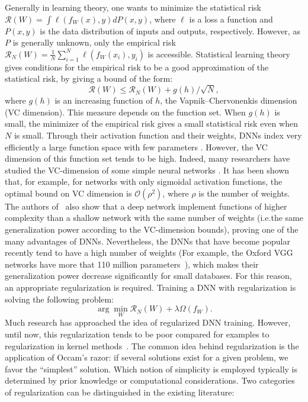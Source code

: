 \documentclass{article}
\begin{document}
Generally in learning theory, one wants to minimize the statistical risk $
\mathcal{R}(W) = \int \ell(f_W(x),y)dP(x,y)$, where $\ell$ is a loss a function and $P(x,y)$ is the data distribution of inputs and outputs, respectively. However, as $P$ is generally unknown, only the empirical risk $\mathcal{R}_N(W) = \frac{1}{N}\sum_{i=1}^N \ell(f_W(x_i),y_i)$ is accessible.
Statistical learning theory \cite{vapnik2013nature} gives conditions for the empirical risk to be a good approximation of the statistical risk, by giving a bound of the form:
\begin{equation}
\mathcal{R}(W) \le \mathcal{R}_N(W) + g(h) / \sqrt{N},
\end{equation}
where $g(h)$ is an increasing function of $h$, the Vapnik–Chervonenkis dimension (VC dimension). This measure depends on the function set. When $g(h)$ is small, the minimizer of the empirical risk gives a small statistical risk even when $N$ is small. Through their activation function and their weights, DNNs index very efficiently a large function space with few parameters \cite{cohen2015expressive}. However, the VC dimension of this function set tends to be high. Indeed, many researchers have studied the VC-dimension of some simple neural networks \cite{bianchini2014complexity, karpinski1997polynomial, sontag1998vc}. It has been shown that, for example, for networks with only sigmoidal activation functions, the optimal bound on VC dimension is $\mathcal{O}(\rho^2)$, where $\rho$ is the number of weights. The authors of~\cite{bianchini2014complexity} also show that a deep network implement functions of higher complexity than a shallow network with the same number of weights (i.e.\with the same generalization power according to the VC-dimension bounds), proving one of the many advantages of DNNs. Nevertheless, the DNNs that have become popular recently tend to have a high number of weights (For example, the Oxford VGG networks have more that 110 million parameters~\cite{simonyan2014very}), which makes their generalization power decrease significantly for small databases. For this reason, an appropriate regularization is required. Training a DNN with regularization is solving the following problem:
\begin{equation}
\arg\min_{W} \mathcal{R}_N(W) + \lambda\Omega(f_W).
\label{eq:prob2}
\end{equation}
Much research has approached the idea of regularized DNN training. However, until now, this regularization tends to be poor compared for examples to regularization in kernel methods~\cite{Scholkopf:2001:LKS:559923}. The common idea behind regularization is the application of Occam's razor: if several solutions exist for a given problem, we favor the ``simplest'' solution.  Which notion of simplicity is employed typically is determined by prior knowledge or computational considerations. Two categories of regularization can be distinguished in the existing literature:
\end{document}

